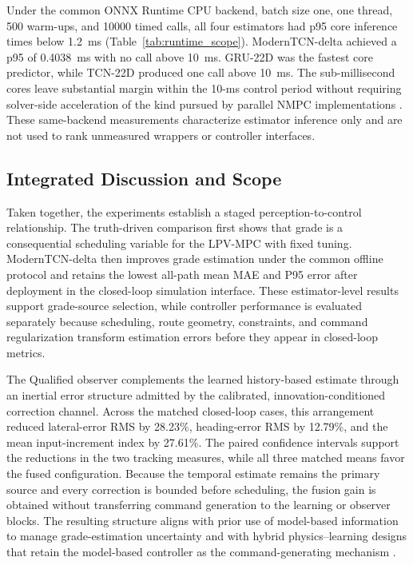 \documentclass{ieeeaccess}
\newcommand{\citep}[1]{\cite{#1}}
\begin{document}
Under the common ONNX Runtime CPU backend, batch size one, one thread, 500 warm-ups, and 10000 timed calls, all four estimators had p95 core inference times below 1.2~ms (Table~\ref{tab:runtime_scope}). ModernTCN-delta achieved a p95 of 0.4038~ms with no call above 10~ms. GRU-22D was the fastest core predictor, while TCN-22D produced one call above 10~ms. The sub-millisecond cores leave substantial margin within the 10-ms control period without requiring solver-side acceleration of the kind pursued by parallel NMPC implementations \citep{Xu2024ParallelNMPC}. These same-backend measurements characterize estimator inference only and are not used to rank unmeasured wrappers or controller interfaces.

\subsection{Integrated Discussion and Scope}

Taken together, the experiments establish a staged perception-to-control relationship. The truth-driven comparison first shows that grade is a consequential scheduling variable for the LPV-MPC with fixed tuning. ModernTCN-delta then improves grade estimation under the common offline protocol and retains the lowest all-path mean MAE and P95 error after deployment in the closed-loop simulation interface. These estimator-level results support grade-source selection, while controller performance is evaluated separately because scheduling, route geometry, constraints, and command regularization transform estimation errors before they appear in closed-loop metrics.

The Qualified observer complements the learned history-based estimate through
an inertial error structure admitted by the calibrated,
innovation-conditioned correction channel. Across the matched closed-loop
cases, this arrangement reduced lateral-error RMS by 28.23\%, heading-error
RMS by 12.79\%, and the mean input-increment index by 27.61\%. The paired
confidence intervals support the reductions in the two tracking measures,
while all three matched means favor the fused configuration. Because the
temporal estimate remains the primary source and every correction
is bounded before scheduling, the fusion gain is obtained without transferring
command generation to the learning or observer blocks. The resulting structure aligns
with prior use of model-based information to manage grade-estimation
uncertainty \citep{Liu2023RoadSlopeAAIMM,Gao2024RoadSlopeHDV} and with hybrid
physics--learning designs that retain the model-based controller as the
command-generating mechanism \citep{Zheng2024HybridPhysicsLearningUSV}.
\end{document}
